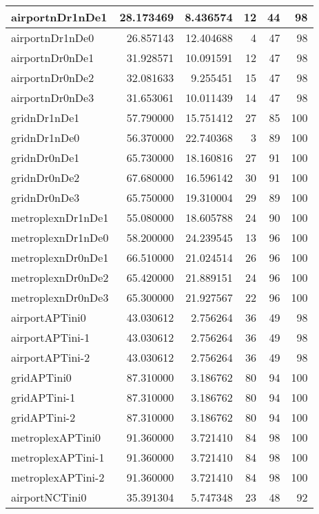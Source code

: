 \begin{longtable}{|l|r|r|r|r|r|}
\endlastfoot
airportnDr1nDe1 & 28.173469 & 8.436574 & 12 & 44 & 98 \\ \hline
airportnDr1nDe0 & 26.857143 & 12.404688 & 4 & 47 & 98 \\ \hline
airportnDr0nDe1 & 31.928571 & 10.091591 & 12 & 47 & 98 \\ \hline
airportnDr0nDe2 & 32.081633 & 9.255451 & 15 & 47 & 98 \\ \hline
airportnDr0nDe3 & 31.653061 & 10.011439 & 14 & 47 & 98 \\ \hline
gridnDr1nDe1 & 57.790000 & 15.751412 & 27 & 85 & 100 \\ \hline
gridnDr1nDe0 & 56.370000 & 22.740368 & 3 & 89 & 100 \\ \hline
gridnDr0nDe1 & 65.730000 & 18.160816 & 27 & 91 & 100 \\ \hline
gridnDr0nDe2 & 67.680000 & 16.596142 & 30 & 91 & 100 \\ \hline
gridnDr0nDe3 & 65.750000 & 19.310004 & 29 & 89 & 100 \\ \hline
metroplexnDr1nDe1 & 55.080000 & 18.605788 & 24 & 90 & 100 \\ \hline
metroplexnDr1nDe0 & 58.200000 & 24.239545 & 13 & 96 & 100 \\ \hline
metroplexnDr0nDe1 & 66.510000 & 21.024514 & 26 & 96 & 100 \\ \hline
metroplexnDr0nDe2 & 65.420000 & 21.889151 & 24 & 96 & 100 \\ \hline
metroplexnDr0nDe3 & 65.300000 & 21.927567 & 22 & 96 & 100 \\ \hline
airportAPTini0 & 43.030612 & 2.756264 & 36 & 49 & 98 \\ \hline
airportAPTini-1 & 43.030612 & 2.756264 & 36 & 49 & 98 \\ \hline
airportAPTini-2 & 43.030612 & 2.756264 & 36 & 49 & 98 \\ \hline
gridAPTini0 & 87.310000 & 3.186762 & 80 & 94 & 100 \\ \hline
gridAPTini-1 & 87.310000 & 3.186762 & 80 & 94 & 100 \\ \hline
gridAPTini-2 & 87.310000 & 3.186762 & 80 & 94 & 100 \\ \hline
metroplexAPTini0 & 91.360000 & 3.721410 & 84 & 98 & 100 \\ \hline
metroplexAPTini-1 & 91.360000 & 3.721410 & 84 & 98 & 100 \\ \hline
metroplexAPTini-2 & 91.360000 & 3.721410 & 84 & 98 & 100 \\ \hline
airportNCTini0 & 35.391304 & 5.747348 & 23 & 48 & 92 \\ \hline

\end{longtable}

